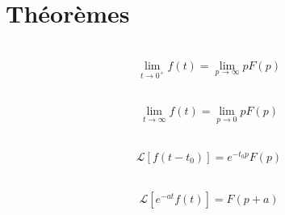\documentclass[10pt,fleqn]{article} %
\begin{document}
\section{Théorèmes}
\begin{multicols}{2}
\begin{theorem} ~\\
$$ \lim\limits_{t \to 0^+} f(t) = \lim\limits_{p \to \infty} pF(p)$$
\end{theorem} 

\begin{theorem} ~\\
$$\lim\limits_{t \to \infty} f(t) = \lim\limits_{p \to 0} pF(p)$$
\end{theorem} 

\begin{theorem} ~\\
$$\mathcal{L}\left[ f\left(t-t_0\right) \right] = e^{-t_0 p}F(p)$$
\end{theorem} 

\begin{theorem} ~\\
$$\mathcal{L} \left[ e^{-a t} f\left(t\right) \right] = F(p+a)$$
\end{theorem} 
\end{multicols}


%
%
\end{document}

